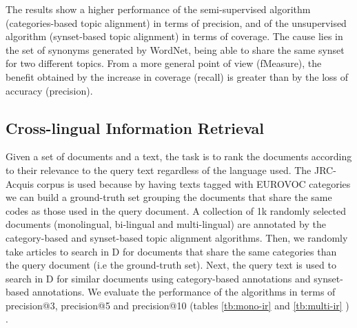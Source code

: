 The results show a higher performance of the semi-supervised algorithm (categories-based topic alignment) in terms of precision, and of the unsupervised algorithm (synset-based topic alignment) in terms of coverage. The cause lies in the set of synonyms generated by WordNet, being able to share the same synset for two different topics. From a more general point of view (fMeasure), the benefit obtained by the increase in coverage (recall) is greater than by the loss of accuracy (precision).


\subsection{Cross-lingual Information Retrieval}
Given a set of documents and a text, the task is to rank the documents according to their relevance to the query text regardless of the language used. The JRC-Acquis corpus is used because by having texts tagged with EUROVOC categories we can build a ground-truth set grouping the documents that share the same codes as those used in the query document. A collection of 1k randomly selected documents (monolingual, bi-lingual and multi-lingual) are annotated by the category-based and synset-based topic alignment algorithms. Then, we randomly take articles to search in D for documents that share the same categories than the query document (i.e  the ground-truth set). Next, the query text is used to search in D for similar documents using category-based annotations and synset-based annotations. We evaluate the performance of the algorithms in terms of precision@3, precision@5 and precision@10 (tables \ref{tb:mono-ir} and \ref{tb:multi-ir} ) .

